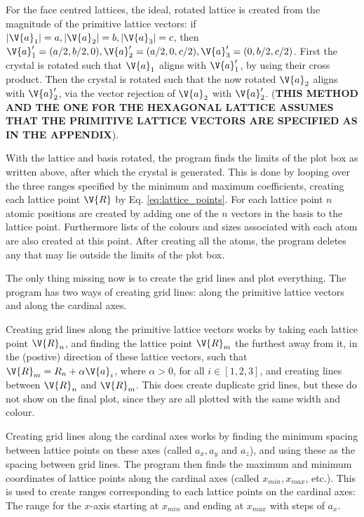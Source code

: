 \documentclass[main.tex]{subfiles}
\begin{document}
	For the face centred lattices, the ideal, rotated lattice is created from the magnitude of the primitive lattice vectors: if $ |\V{a}_1| = a, |\V{a}_2| = b, |\V{a}_3| = c $, then $ \V{a}'_1 = (a/2, b/2, 0), \V{a}'_2 = (a/2, 0, c/2), \V{a}'_3 = (0, b/2, c/2) $. First the crystal is rotated such that $ \V{a}_1 $ aligns with $ \V{a}'_1 $, by using their cross product. Then the crystal is rotated such that the now rotated $ \V{a}_2 $ aligns with $ \V{a}'_2 $, via the vector rejection of $ \V{a}_2 $ with $ \V{a}'_2 $. (\textbf{THIS METHOD AND THE ONE FOR THE HEXAGONAL LATTICE ASSUMES THAT THE PRIMITIVE LATTICE VECTORS ARE SPECIFIED AS IN THE APPENDIX}).
	
	With the lattice and basis rotated, the program finds the limits of the plot box as written above, after which the crystal is generated. This is done by looping over the three ranges specified by the minimum and maximum coefficients, creating each lattice point $ \V{R} $ by Eq. \eqref{eq:lattice_points}. For each lattice point $ n $ atomic positions are created by adding one of the $ n $ vectors in the basis to the lattice point. Furthermore lists of the colours and sizes associated with each atom are also created at this point. After creating all the atoms, the program deletes any that may lie outside the limits of the plot box.
	
	The only thing missing now is to create the grid lines and plot everything. The program has two ways of creating grid lines: along the primitive lattice vectors and along the cardinal axes.
	
	Creating grid lines along the primitive lattice vectors works by taking each lattice point $ \V{R}_n $, and finding the lattice point $ \V{R}_m $ the furthest away from it, in the (postive) direction of these lattice vectors, such that $ \V{R}_m = R_n + \alpha \V{a}_i $, where $ \alpha > 0 $, for all $ i \in [1,2,3] $, and creating lines between $ \V{R}_n $ and $ \V{R}_m $. This does create duplicate grid lines, but these do not show on the final plot, since they are all plotted with the same width and colour.
	
	Creating grid lines along the cardinal axes works by finding the minimum spacing between lattice points on these axes (called $ a_x, a_y$ and $ a_z $), and using these as the spacing between grid lines. The program then finds the maximum and minimum coordinates of lattice points along the cardinal axes (called $x_{min}, x_{max}$, etc.). This is used to create ranges corresponding to each lattice points on the cardinal axes: The range for the $ x $-axis starting at $ x_{min} $  and ending at $ x_{max} $ with steps of $ a_x $.
	
\end{document}
